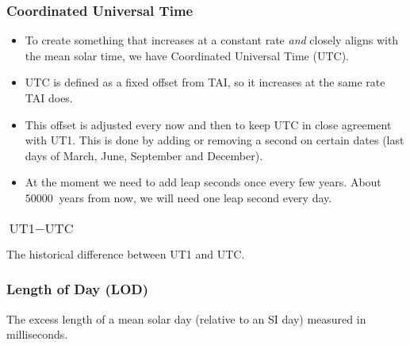 \documentclass{beamer}
\begin{document}
\begin{frame}
  \frametitle{Coordinated Universal Time}

  \begin{itemize}
  \item To create something that increases at a constant rate \emph{and} closely
    aligns with the mean solar time, we have Coordinated Universal Time (UTC).
  \item UTC is defined as a fixed offset from TAI, so it increases at the same
    rate TAI does.
  \item This offset is adjusted every now and then to keep UTC in close
    agreement with UT1. This is done by adding or removing a second on certain
    dates (last days of March, June, September and December).
  \item At the moment we need to add leap seconds once every few years. About
    $\SI{50000}{}$ years from now, we will need one leap second every day.
  \end{itemize}
\end{frame}

\begin{frame}
  \frametitle{$\text{UT1} - \text{UTC}$}

  \begin{center}
  \end{center}

  \begin{center}
    The historical difference between UT1 and UTC.
  \end{center}
\end{frame}

\begin{frame}
  \frametitle{Length of Day (LOD)}

  \begin{center}
  \end{center}

  \begin{center}
    The excess length of a mean solar day (relative to an SI day) measured in
    milliseconds.
  \end{center}
\end{frame}
\end{document}
